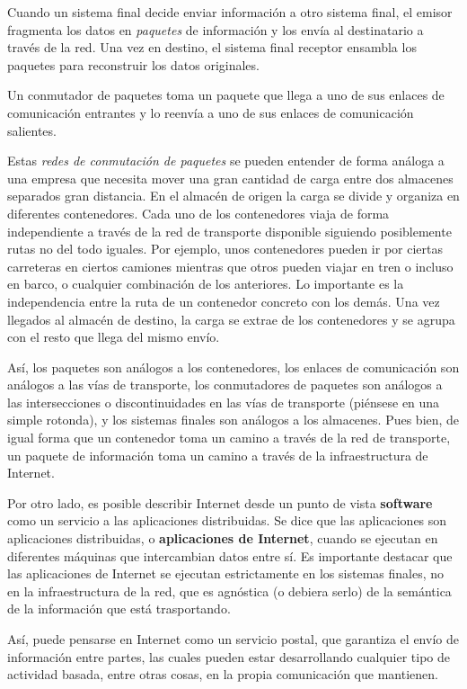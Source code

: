 \documentclass[a4paper]{report}
\begin{document}
    Cuando un sistema final decide enviar información a otro sistema final, el emisor fragmenta los datos en \emph{paquetes} de información y los envía al destinatario a través de la red. Una vez en destino, el sistema final receptor ensambla los paquetes para reconstruir los datos originales.

    Un conmutador de paquetes toma un paquete que llega a uno de sus enlaces de comunicación entrantes y lo reenvía a uno de sus enlaces de comunicación salientes.

    Estas \emph{redes de conmutación de paquetes} se pueden entender de forma análoga a una empresa que necesita mover una gran cantidad de carga entre dos almacenes separados gran distancia. En el almacén de origen la carga se divide y organiza en diferentes contenedores. Cada uno de los contenedores viaja de forma independiente a través de la red de transporte disponible siguiendo posiblemente rutas no del todo iguales. Por ejemplo, unos contenedores pueden ir por ciertas carreteras en ciertos camiones mientras que otros pueden viajar en tren o incluso en barco, o cualquier combinación de los anteriores. Lo importante es la independencia entre la ruta de un contenedor concreto con los demás. Una vez llegados al almacén de destino, la carga se extrae de los contenedores y se agrupa con el resto que llega del mismo envío.
    
    Así, los paquetes son análogos a los contenedores, los enlaces de comunicación son análogos a las vías de transporte, los conmutadores de paquetes son análogos a las intersecciones o discontinuidades en las vías de transporte (piénsese en una simple rotonda), y los sistemas finales son análogos a los almacenes. Pues bien, de igual forma que un contenedor toma un camino a través de la red de transporte, un paquete de información toma un camino a través de la infraestructura de Internet.

    Por otro lado, es posible describir Internet desde un punto de vista \textbf{software} como un servicio a las aplicaciones distribuidas. Se dice que las aplicaciones son aplicaciones distribuidas, o \textbf{aplicaciones de Internet}, cuando se ejecutan en diferentes máquinas que intercambian datos entre sí. Es importante destacar que las aplicaciones de Internet se ejecutan estrictamente en los sistemas finales, no en la infraestructura de la red, que es agnóstica (o debiera serlo) de la semántica de la información que está trasportando.
    
    Así, puede pensarse en Internet como un servicio postal, que garantiza el envío de información entre partes, las cuales pueden estar desarrollando cualquier tipo de actividad basada, entre otras cosas, en la propia comunicación que mantienen.
    
\end{document}
